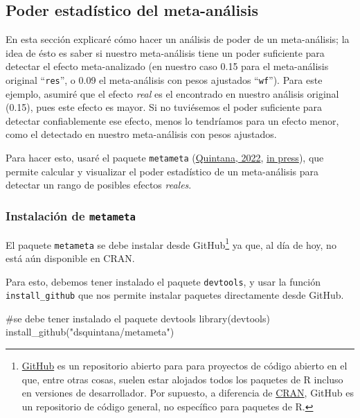 \documentclass[
  bookmarksnumbered]{article}
\newenvironment{Shaded}{\begin{snugshade}}{\end{snugshade}}
\newcommand{\CommentTok}[1]{\textcolor[rgb]{0.54,0.53,0.53}{#1}}
\newcommand{\FunctionTok}[1]{\textcolor[rgb]{0.39,0.29,0.61}{#1}}
\newcommand{\NormalTok}[1]{\textcolor[rgb]{0.12,0.11,0.11}{#1}}
\newcommand{\StringTok}[1]{\textcolor[rgb]{0.75,0.01,0.01}{#1}}
\begin{document}
\hypertarget{poder-estaduxedstico-del-meta-anuxe1lisis}{%
\subsection{Poder estadístico del meta-análisis}\label{poder-estaduxedstico-del-meta-anuxe1lisis}}

En esta sección explicaré cómo hacer un análisis de poder de un meta-análisis; la idea de ésto es saber si nuestro meta-análisis tiene un poder suficiente para detectar el efecto meta-analizado (en nuestro caso 0.15 para el meta-análisis original ``\texttt{res}'', o 0.09 el meta-análisis con pesos ajustados ``\texttt{wf}''). Para este ejemplo, asumiré que el efecto \emph{real} es el encontrado en nuestro análisis original (0.15), pues este efecto es mayor. Si no tuviésemos el poder suficiente para detectar confiablemente ese efecto, menos lo tendríamos para un efecto menor, como el detectado en nuestro meta-análisis con pesos ajustados.

Para hacer esto, usaré el paquete \texttt{metameta} (\protect\hyperlink{ref-quintanaMetameta2022}{Quintana, 2022}, \protect\hyperlink{ref-quintanaGuideMetaPower}{in press}), que permite calcular y visualizar el poder estadístico de un meta-análisis para detectar un rango de posibles efectos \emph{reales}.

\hypertarget{instalaciuxf3n-de-metameta}{%
\subsubsection{\texorpdfstring{Instalación de \texttt{metameta}}{Instalación de metameta}}\label{instalaciuxf3n-de-metameta}}

El paquete \texttt{metameta} se debe instalar desde GitHub\footnote{\href{https://github.com/}{GitHub} es un repositorio abierto para para proyectos de código abierto en el que, entre otras cosas, suelen estar alojados todos los paquetes de R incluso en versiones de desarrollador. Por supuesto, a diferencia de \href{https://cran.r-project.org/}{CRAN}, GitHub es un repositorio de código general, no específico para paquetes de R.} ya que, al día de hoy, no está aún disponible en CRAN.

Para esto, debemos tener instalado el paquete \texttt{devtools}, y usar la función \texttt{install\_github} que nos permite instalar paquetes directamente desde GitHub.

\begin{Shaded}
\begin{Highlighting}[]
\CommentTok{\#se debe tener instalado el paquete devtools}
\FunctionTok{library}\NormalTok{(devtools)}
\FunctionTok{install\_github}\NormalTok{(}\StringTok{"dsquintana/metameta"}\NormalTok{)}
\end{Highlighting}
\end{Shaded}
\end{document}
